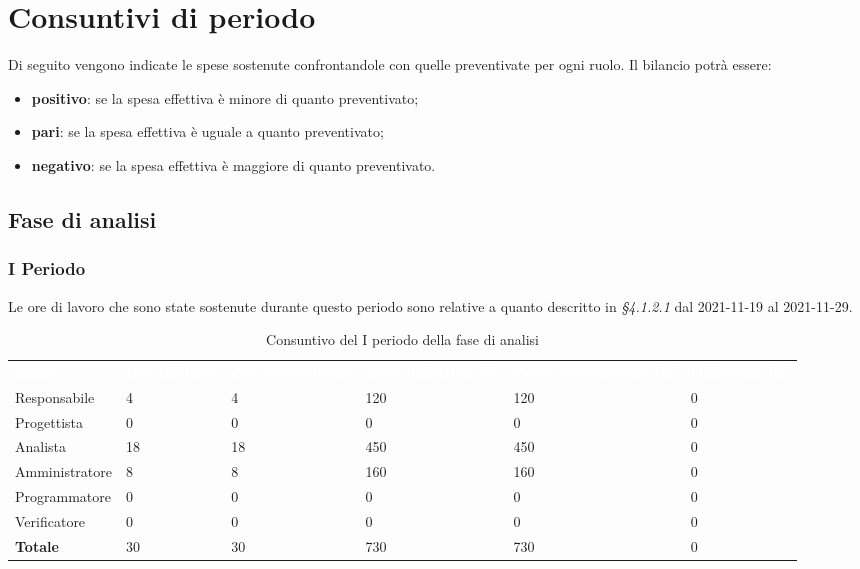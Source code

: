 \section{Consuntivi di periodo}
Di seguito vengono indicate le spese sostenute confrontandole con quelle preventivate per ogni ruolo.  Il bilancio potrà essere:
\begin{itemize}
\item \textbf{positivo}: se la spesa effettiva è minore di quanto preventivato;
\item \textbf{pari}: se la spesa effettiva è uguale a quanto preventivato;
\item \textbf{negativo}: se la spesa effettiva è maggiore di quanto preventivato.
\end{itemize}

\subsection{Fase di analisi}
\subsubsection{I Periodo}
Le ore di lavoro che sono state sostenute durante questo periodo sono relative a quanto descritto in \textit{§4.1.2.1} dal 2021-11-19 al 2021-11-29.

\begin{table}[H]
\begin{center}
\renewcommand{\arraystretch}{1.5}
\begin{tabular}{ m{}<{\centering}  m{}<{\centering} m{}<{\centering} m{}<{\centering} m{}<{\centering} m{}<{\centering}}
	\rowcolor{darkblue}
	\textcolor{white}{\textbf{Ruolo}} & \textcolor{white}{\textbf{Ore Effettive}} & \textcolor{white}{\textbf{Ore Preventivate}}&\textcolor{white}{\textbf{Costo Effettivo (\euro) }}&\textcolor{white}{\textbf{Costo Preventivato (\euro)}}&\textcolor{white}{\textbf{Differenza (\euro)}}\\ 

	Responsabile  & 4 & 4 & 120 & 120 & 0\\	
	
	Progettista & 0 & 0 & 0 & 0 & 0\\
	
	Analista & 18 & 18 & 450 & 450 & 0\\
	
	Amministratore & 8 & 8 & 160 & 160 & 0\\
	
	Programmatore & 0 & 0 &0 &0 & 0\\
	
	Verificatore & 0 & 0 & 0 & 0 & 0\\
	
	\textbf{Totale} & 30 & 30 & 730 & 730 & 0\\
	
\end{tabular}
\caption{Consuntivo del I periodo della fase di analisi}
\end{center}
\end{table}


